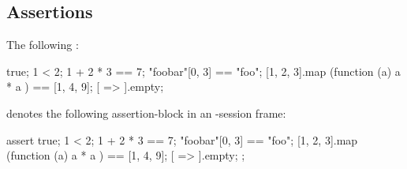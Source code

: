 \subsection{\us Assertions}
\label{sec:notations:urbiassert}

The following :

\begin{urbiassert}
true;
1 < 2;
1 + 2 * 3 == 7;
"foobar"[0, 3] == "foo";
[1, 2, 3].map (function (a) { a * a }) == [1, 4, 9];
[ => ].empty;
\end{urbiassert}

\noindent
denotes the following assertion-block in an \us-session frame:

\begin{urbiscript}
assert
{
  true;
  1 < 2;
  1 + 2 * 3 == 7;
  "foobar"[0, 3] == "foo";
  [1, 2, 3].map (function (a) { a * a }) == [1, 4, 9];
  [ => ].empty;
};
\end{urbiscript}

